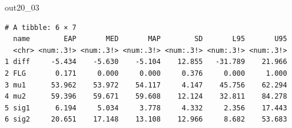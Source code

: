 \begin{MCMCout}{}{out20_03}
	\begin{verbatim}
# A tibble: 6 × 7
  name        EAP       MED       MAP        SD       L95       U95
  <chr> <num:.3!> <num:.3!> <num:.3!> <num:.3!> <num:.3!> <num:.3!>
1 diff     -5.434    -5.630    -5.104    12.855   -31.789    21.966
2 FLG       0.171     0.000     0.000     0.376     0.000     1.000
3 mu1      53.962    53.972    54.117     4.147    45.756    62.294
4 mu2      59.396    59.671    59.608    12.124    32.811    84.278
5 sig1      6.194     5.034     3.778     4.332     2.356    17.443
6 sig2     20.651    17.148    13.108    12.966     8.682    53.683
\end{verbatim}
\end{MCMCout}
